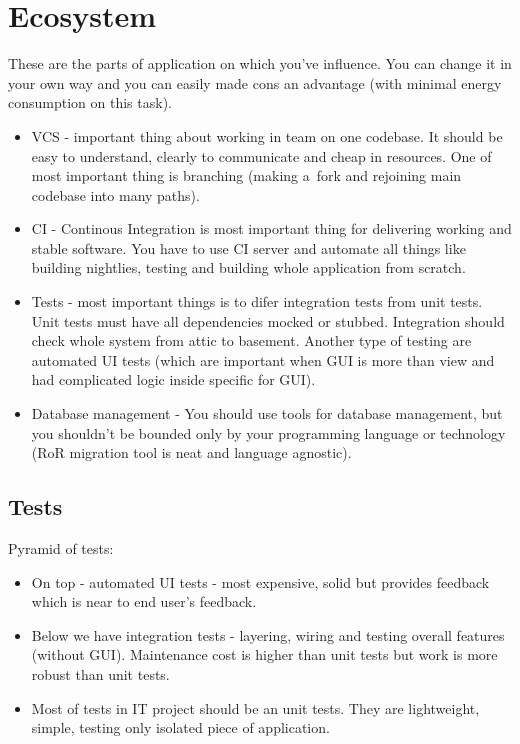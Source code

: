 \documentclass[11pt,a4paper]{article}
\begin{document}
\section{Ecosystem} 
These are the parts of application on which you've influence. You can change it in your own way and you can easily made cons an advantage (with minimal energy consumption on this task).

\begin{itemize}
	\item VCS - important thing about working in team on one codebase. It should be easy to understand, clearly to communicate and cheap in resources. One of most important thing is branching (making a~fork and rejoining main codebase into many paths).
	\item CI - Continous Integration is most important thing for delivering working and stable software. You have to use CI server and automate all things like building nightlies, testing and building whole application from scratch.
	\item Tests - most important things is to difer integration tests from unit tests. Unit tests must have all dependencies mocked or stubbed. Integration should check whole system from attic to basement. Another type of testing are automated UI tests (which are important when GUI is more than view and had complicated logic inside specific for GUI).
	\item Database management - You should use tools for database management, but you shouldn't be bounded only by your programming language or technology (RoR migration tool is neat and language agnostic).
\end{itemize}

\subsection{Tests}

Pyramid of tests:
\begin{itemize}
	\item On top - automated UI tests - most expensive, solid but provides feedback which is near to end user's feedback.
	\item Below we have integration tests - layering, wiring and testing overall features (without GUI). Maintenance cost is higher than unit tests but work is more robust than unit tests.
	\item Most of tests in IT project should be an unit tests. They are lightweight, simple, testing only isolated piece of application.
\end{itemize}
\end{document}
